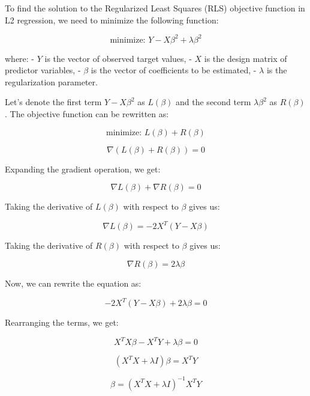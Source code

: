 \begin{boxC}
    

To find the solution to the Regularized Least Squares (RLS) objective function in L2 regression, we need to minimize the following function:

\[
\text{minimize: }  Y - X\beta^2 + \lambda\beta^2
\]

where:
- \(Y\) is the vector of observed target values,
- \(X\) is the design matrix of predictor variables,
- \(\beta\) is the vector of coefficients to be estimated,
- \(\lambda\) is the regularization parameter.

Let's denote the first term \(Y - X\beta^2\) as \(L(\beta)\) and the second term \(\lambda\beta^2\) as \(R(\beta)\). The objective function can be rewritten as:

\[
\text{minimize: } L(\beta) + R(\beta)
\]


\[
\nabla(L(\beta) + R(\beta)) = 0
\]

Expanding the gradient operation, we get:

\[
\nabla L(\beta) + \nabla R(\beta) = 0
\]

Taking the derivative of \(L(\beta)\) with respect to \(\beta\) gives us:

\[
\nabla L(\beta) = -2X^T(Y - X\beta)
\]

Taking the derivative of \(R(\beta)\) with respect to \(\beta\) gives us:

\[
\nabla R(\beta) = 2\lambda\beta
\]

Now, we can rewrite the equation as:

\[
-2X^T(Y - X\beta) + 2\lambda\beta = 0
\]

Rearranging the terms, we get:

\[
X^TX\beta - X^TY + \lambda\beta = 0
\]


\[
(X^TX + \lambda I)\beta = X^TY
\]

% 

\[
\beta = (X^TX + \lambda I)^{-1}X^TY
\]

\end{boxC}

